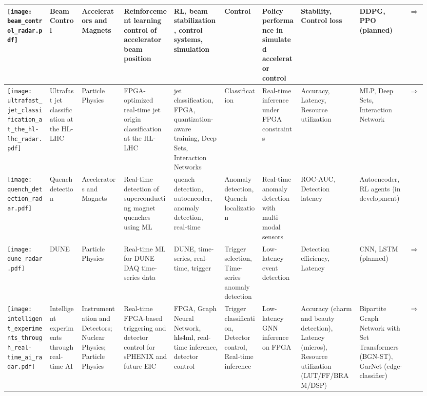 \begin{landscape}
{\begin{longtable}{|p{}|p{}|p{}|p{}|p{}|p{}|p{}|p{}|p{}|p{}|}
\texttt{[image: beam\_control\_radar.pdf]} & Beam Control & Accelerators and Magnets & Reinforcement learning control of accelerator beam position & RL, beam stabilization, control systems, simulation & Control & Policy performance in simulated accelerator control & Stability, Control loss & DDPG, PPO (planned) & \cite{duarte2022fastmlsciencebenchmarksaccelerating,kafkes2021boostrdatasetacceleratorcontrol}\href{https://github.com/fastmachinelearning/fastml-science/tree/main/beam-control}{$\Rightarrow$} \\ \hline
\texttt{[image: ultrafast\_jet\_classification\_at\_the\_hl-lhc\_radar.pdf]} & Ultrafast jet classification at the HL-LHC & Particle Physics & FPGA-optimized real-time jet origin classification at the HL-LHC & jet classification, FPGA, quantization-aware training, Deep Sets, Interaction Networks & Classification & Real-time inference under FPGA constraints & Accuracy, Latency, Resource utilization & MLP, Deep Sets, Interaction Network & \cite{odagiu2024ultrafastjetclassificationfpgas}\href{https://arxiv.org/pdf/2402.01876}{$\Rightarrow$} \\ \hline
\texttt{[image: quench\_detection\_radar.pdf]} & Quench detection & Accelerators and Magnets & Real-time detection of superconducting magnet quenches using ML & quench detection, autoencoder, anomaly detection, real-time & Anomaly detection, Quench localization & Real-time anomaly detection with multi-modal sensors & ROC-AUC, Detection latency & Autoencoder, RL agents (in development) \\ \hline
\texttt{[image: dune\_radar.pdf]} & DUNE & Particle Physics & Real-time ML for DUNE DAQ time-series data & DUNE, time-series, real-time, trigger & Trigger selection, Time-series anomaly detection & Low-latency event detection & Detection efficiency, Latency & CNN, LSTM (planned) & \cite{abud2021deep}\href{https://indico.fnal.gov/event/66520/contributions/301423/attachments/182439/250508/fast\_ml\_dunedaq\_sonic\_10\_15\_24.pdf}{$\Rightarrow$} \\ \hline
\texttt{[image: intelligent\_experiments\_through\_real-time\_ai\_radar.pdf]} & Intelligent experiments through real-time AI & Instrumentation and Detectors; Nuclear Physics; Particle Physics & Real-time FPGA-based triggering and detector control for sPHENIX and future EIC & FPGA, Graph Neural Network, hls4ml, real-time inference, detector control & Trigger classification, Detector control, Real-time inference & Low-latency GNN inference on FPGA & Accuracy (charm and beauty detection), Latency (micros), Resource utilization (LUT/FF/BRAM/DSP) & Bipartite Graph Network with Set Transformers (BGN-ST), GarNet (edge-classifier) & \cite{kvapil2025intelligentexperimentsrealtimeai}\href{https://arxiv.org/pdf/2501.04845}{$\Rightarrow$} \\ \hline

\end{longtable}}
\end{landscape}
